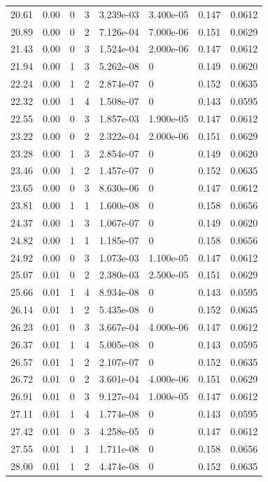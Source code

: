 \documentclass[preview]{standalone}
\begin{document}
{{{\begin{tabular}{L{1.2cm}C{1.2cm} C{0.3cm}C{0.5cm} C{1.4cm}C{1.4cm} C{1.4cm}C{1.4cm}}
  20.61  &  0.00  & 0     &  3 &  3.239e-03  & 3.400e-05  & 0.147 &  0.0612   \\ 
  20.89  &  0.00  & 0     &  2 &  7.126e-04  & 7.000e-06  & 0.151 &  0.0629   \\ 
  21.43  &  0.00  & 0     &  3 &  1.524e-04  & 2.000e-06  & 0.147 &  0.0612   \\ 
  21.94  &  0.00  & 1     &  3 &  5.262e-08  & 0  & 0.149 &  0.0620   \\ 
  22.24  &  0.00  & 1     &  2 &  2.874e-07  & 0  & 0.152 &  0.0635   \\ 
  22.32  &  0.00  & 1     &  4 &  1.508e-07  & 0  & 0.143 &  0.0595   \\ 
  22.55  &  0.00  & 0     &  3 &  1.857e-03  & 1.900e-05  & 0.147 &  0.0612   \\ 
  23.22  &  0.00  & 0     &  2 &  2.322e-04  & 2.000e-06  & 0.151 &  0.0629   \\ 
  23.28  &  0.00  & 1     &  3 &  2.854e-07  & 0  & 0.149 &  0.0620   \\ 
  23.46  &  0.00  & 1     &  2 &  1.457e-07  & 0  & 0.152 &  0.0635   \\ 
  23.65  &  0.00  & 0     &  3 &  8.630e-06  & 0  & 0.147 &  0.0612   \\ 
  23.81  &  0.00  & 1     &  1 &  1.600e-08  & 0  & 0.158 &  0.0656   \\ 
  24.37  &  0.00  & 1     &  3 &  1.067e-07  & 0  & 0.149 &  0.0620   \\ 
  24.82  &  0.00  & 1     &  1 &  1.185e-07  & 0  & 0.158 &  0.0656   \\ 
  24.92  &  0.00  & 0     &  3 &  1.073e-03  & 1.100e-05  & 0.147 &  0.0612   \\ 
  25.07  &  0.01  & 0     &  2 &  2.380e-03  & 2.500e-05  & 0.151 &  0.0629   \\ 
  25.66  &  0.01  & 1     &  4 &  8.934e-08  & 0  & 0.143 &  0.0595   \\ 
  26.14  &  0.01  & 1     &  2 &  5.435e-08  & 0  & 0.152 &  0.0635   \\ 
  26.23  &  0.01  & 0     &  3 &  3.667e-04  & 4.000e-06  & 0.147 &  0.0612   \\ 
  26.37  &  0.01  & 1     &  4 &  5.005e-08  & 0  & 0.143 &  0.0595   \\ 
  26.57  &  0.01  & 1     &  2 &  2.107e-07  & 0  & 0.152 &  0.0635   \\ 
  26.72  &  0.01  & 0     &  2 &  3.601e-04  & 4.000e-06  & 0.151 &  0.0629   \\ 
  26.91  &  0.01  & 0     &  3 &  9.127e-04  & 1.000e-05  & 0.147 &  0.0612   \\ 
  27.11  &  0.01  & 1     &  4 &  1.774e-08  & 0  & 0.143 &  0.0595   \\ 
  27.42  &  0.01  & 0     &  3 &  4.258e-05  & 0  & 0.147 &  0.0612   \\ 
  27.55  &  0.01  & 1     &  1 &  1.711e-08  & 0  & 0.158 &  0.0656   \\ 
  28.00  &  0.01  & 1     &  2 &  4.474e-08  & 0  & 0.152 &  0.0635   \\ 
\hline 
\end{tabular} 

}}}
\end{document}
